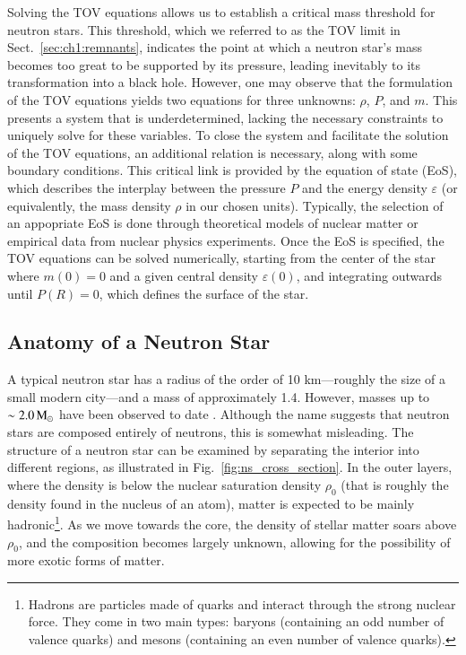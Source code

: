 \documentclass[main.tex]{subfiles}
\begin{document}
     Solving the TOV equations allows us to establish a critical mass threshold for neutron stars. This threshold, which we referred to as the TOV limit in Sect.~\ref{sec:ch1:remnants}, indicates the point at which a neutron star’s mass becomes too great to be supported by its pressure, leading inevitably to its transformation into a black hole. However, one may observe that the formulation of the TOV equations yields two equations for three unknowns: $\rho$, $P$, and $m$. This presents a system that is underdetermined, lacking the necessary constraints to uniquely solve for these variables. To close the system and facilitate the solution of the TOV equations, an additional relation is necessary, along with some boundary conditions. This critical link is provided by the equation of state (EoS), which describes the interplay between the pressure $P$ and the energy density $\varepsilon$ (or equivalently, the mass density $\rho$ in our chosen units). Typically, the selection of an appopriate EoS is done through theoretical models of nuclear matter or empirical data from nuclear physics experiments. Once the EoS is specified, the TOV equations can be solved numerically, starting from the center of the star where $m(0) = 0$ and a given central density $\varepsilon(0)$, and integrating outwards until $P(R) = 0$, which defines the surface of the star.
     

    \subsection{Anatomy of a Neutron Star}\label{sec:ns_anatomy}
    A typical neutron star has a radius of the order of 10 km---roughly the size of a small modern city---and a mass of approximately 1.4\msun. However, masses up to $\sim 2.0\mathrm{\,M_\odot}$ have been observed to date \citep[e.g.,][]{feryal2016}. Although the name suggests that neutron stars are composed entirely of neutrons, this is somewhat misleading.
    The structure of a neutron star can be examined by separating the interior into different regions, as illustrated in Fig.~\ref{fig:ns_cross_section}. In the outer layers, where the density is below the nuclear saturation density $\rho_0$ (that is roughly the density found in the nucleus of an atom), matter is expected to be mainly hadronic\footnote{Hadrons are particles made of quarks and interact through the strong nuclear force. They come in two main types: baryons (containing an odd number of valence quarks) and mesons (containing an even number of valence quarks).}. As we move towards the core, the density of stellar matter soars above $\rho_0$, and the composition becomes largely unknown, allowing for the possibility of more exotic forms of matter.
\end{document}
